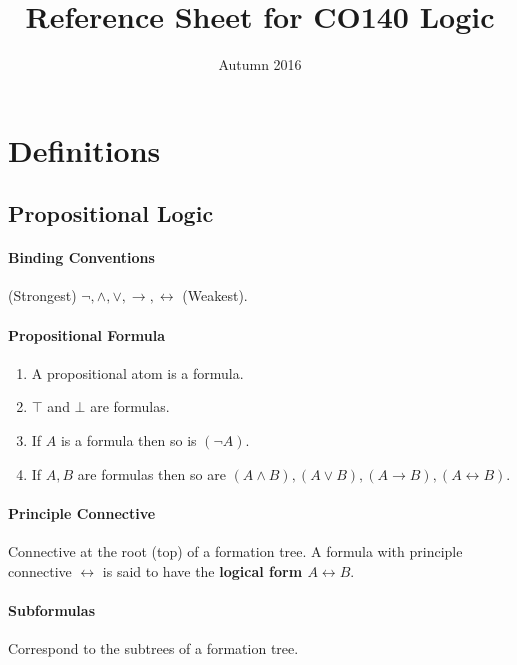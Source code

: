 \documentclass[10pt,twoside,twocolumn]{article}
\begin{document}
\title{Reference Sheet for CO140 Logic}


\date{Autumn 2016}

\maketitle

\section{Definitions}


\subsection{Propositional Logic}


\paragraph{Binding Conventions}

(Strongest) $\lnot,\land,\lor,\rightarrow,\leftrightarrow$ (Weakest).


\paragraph{Propositional Formula}
\begin{enumerate}
\item A propositional atom is a formula.
\item $\top$ and $\bot$ are formulas.
\item If $A$ is a formula then so is $(\lnot A)$.
\item If \textbf{$A,B$} are formulas then so are $(A\land B),(A\lor B),(A\rightarrow B),(A\leftrightarrow B)$.
\end{enumerate}

\paragraph{Principle Connective}

Connective at the root (top) of a formation tree. A formula with principle
connective $\leftrightarrow$ is said to have the \textbf{logical
form $A\leftrightarrow B$}.


\paragraph{Subformulas}

Correspond to the subtrees of a formation tree.
\end{document}
